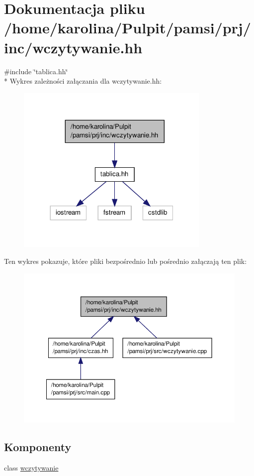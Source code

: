 \hypertarget{wczytywanie_8hh}{\section{Dokumentacja pliku /home/karolina/\-Pulpit/pamsi/prj/inc/wczytywanie.hh}
\label{wczytywanie_8hh}
}
{\ttfamily \#include \char`\"{}tablica.\-hh\char`\"{}}\\*
Wykres zależności załączania dla wczytywanie.\-hh\-:
\nopagebreak
\begin{figure}[H]
\begin{center}
\leavevmode
\includegraphics[width=264pt]{wczytywanie_8hh__incl}
\end{center}
\end{figure}
Ten wykres pokazuje, które pliki bezpośrednio lub pośrednio załączają ten plik\-:
\nopagebreak
\begin{figure}[H]
\begin{center}
\leavevmode
\includegraphics[width=350pt]{wczytywanie_8hh__dep__incl}
\end{center}
\end{figure}
\subsection*{Komponenty}
\begin{DoxyCompactItemize}
\item 
class \hyperlink{classwczytywanie}{wczytywanie}
\end{DoxyCompactItemize}
